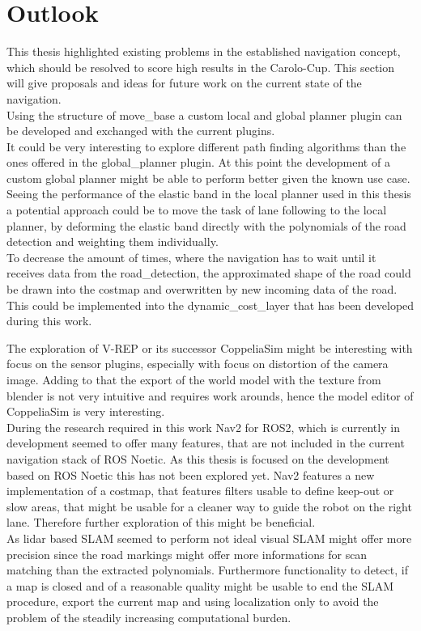 \chapter{Outlook}
\label{outlook}

This thesis highlighted existing problems in the established navigation concept, which should be resolved to score high results in the Carolo-Cup. This section will give proposals and ideas for future work on the current state of the navigation.\\

Using the structure of move\_base a custom local and global planner plugin can be developed and exchanged with the current plugins.\\

It could be very interesting to explore different path finding algorithms than the ones offered in the global\_planner plugin. At this point the development of a custom global planner might be able to perform better given the known use case.\\

Seeing the performance of the elastic band in the local planner used in this thesis a potential approach could be to move the task of lane following to the local planner, by deforming the elastic band directly with the polynomials of the road detection and weighting them individually.\\

To decrease the amount of times, where the navigation has to wait until it receives data from the road\_detection, the approximated shape of the road could be drawn into the costmap and overwritten by new incoming data of the road. This could be implemented into the dynamic\_cost\_layer that has been developed during this work.

The exploration of V-REP or its successor CoppeliaSim might be interesting with focus on the sensor plugins, especially with focus on distortion of the camera image. Adding to that the export of the world model with the texture from blender is not very intuitive and requires work arounds, hence the model editor of CoppeliaSim is very interesting. \\

During the research required in this work Nav2 for ROS2, which is currently in development seemed to offer many features, that are not included in the current navigation stack of ROS Noetic. As this thesis is focused on the development based on ROS Noetic this has not been explored yet. Nav2 features a new implementation of a costmap, that features filters usable to define keep-out or slow areas, that might be usable for a cleaner way to guide the robot on the right lane. Therefore further exploration of this might be beneficial.\\

As lidar based SLAM seemed to perform not ideal visual SLAM might offer more precision since the road markings might offer more informations for scan matching than the extracted polynomials. Furthermore functionality to detect, if a map is closed and of a reasonable quality might be usable to end the SLAM procedure, export the current map and using localization only to avoid the problem of the steadily increasing computational burden.
